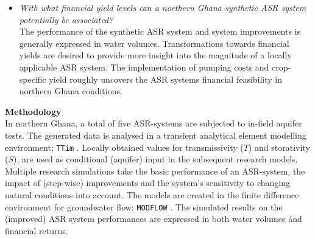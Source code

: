 \begin{itemize}
\item{\textit{With what financial yield levels can a northern Ghana synthetic ASR system potentially be associated?}
\smallskip \\
The performance of the synthetic ASR system and system improvements is generally expressed in water volumes. Transformations towards financial yields are desired to provide more insight into the magnitude of a locally applicable ASR system. The implementation of pumping costs and crop-specific yield roughly uncovers the ASR systems financial feasibility in northern Ghana conditions.}
\end{itemize}

\textbf{Methodology} \\
In northern Ghana, a total of five ASR-systems are subjected to in-field aquifer tests. The generated data is analysed in a transient analytical element modelling environment; \texttt{TTim} \citep{Mishra2013,Bakker2013}. Locally obtained values for transmissivity ($T$) and storativity ($S$), are used as conditional (aquifer) input in the subsequent research models. Multiple research simulations take the basic performance of an ASR-system, the impact of (step-wise) improvements and the system's sensitivity to changing natural conditions into account. The models are created in the finite difference environment for groundwater flow; \texttt{MODFLOW} \citep{Niswonger2011,HarbaughArlen2005}. The simulated results on the (improved) ASR system performances are expressed in both water volumes ánd financial returns. \\ 

